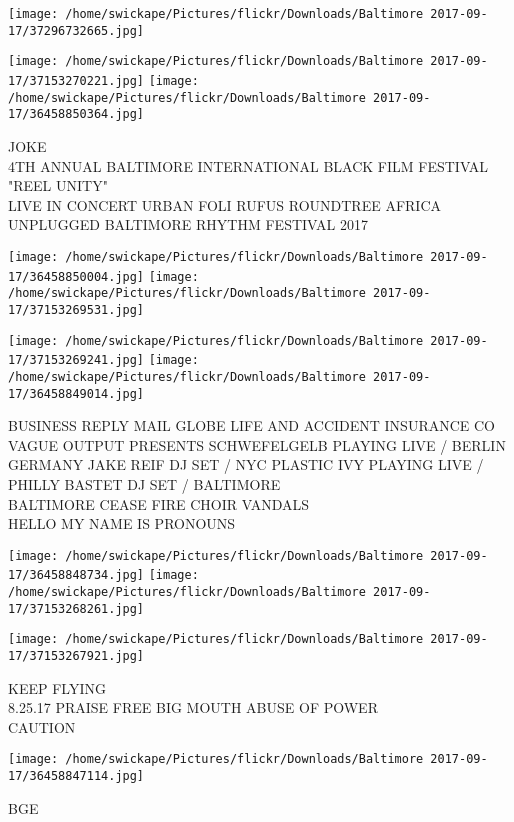 \documentclass[10pt,letterpaper]{article}
\begin{document}
\texttt{[image: /home/swickape/Pictures/flickr/Downloads/Baltimore 2017-09-17/37296732665.jpg]}

\vspace{0.25in}
\texttt{[image: /home/swickape/Pictures/flickr/Downloads/Baltimore 2017-09-17/37153270221.jpg]}
\texttt{[image: /home/swickape/Pictures/flickr/Downloads/Baltimore 2017-09-17/36458850364.jpg]}

JOKE\\
4TH ANNUAL BALTIMORE INTERNATIONAL BLACK FILM FESTIVAL "REEL UNITY"\\
LIVE IN CONCERT URBAN FOLI RUFUS ROUNDTREE AFRICA UNPLUGGED BALTIMORE RHYTHM FESTIVAL 2017\\
\pagebreak

\texttt{[image: /home/swickape/Pictures/flickr/Downloads/Baltimore 2017-09-17/36458850004.jpg]}
\texttt{[image: /home/swickape/Pictures/flickr/Downloads/Baltimore 2017-09-17/37153269531.jpg]}

\texttt{[image: /home/swickape/Pictures/flickr/Downloads/Baltimore 2017-09-17/37153269241.jpg]}
\texttt{[image: /home/swickape/Pictures/flickr/Downloads/Baltimore 2017-09-17/36458849014.jpg]}

BUSINESS REPLY MAIL GLOBE LIFE AND ACCIDENT INSURANCE CO\\
VAGUE OUTPUT PRESENTS SCHWEFELGELB  PLAYING LIVE / BERLIN GERMANY JAKE REIF DJ SET / NYC PLASTIC IVY PLAYING LIVE / PHILLY BASTET DJ SET / BALTIMORE\\
BALTIMORE CEASE FIRE CHOIR VANDALS\\
HELLO MY NAME IS PRONOUNS\\
\pagebreak

\texttt{[image: /home/swickape/Pictures/flickr/Downloads/Baltimore 2017-09-17/36458848734.jpg]}
\texttt{[image: /home/swickape/Pictures/flickr/Downloads/Baltimore 2017-09-17/37153268261.jpg]}

\texttt{[image: /home/swickape/Pictures/flickr/Downloads/Baltimore 2017-09-17/37153267921.jpg]}

KEEP FLYING\\
8.25.17 PRAISE FREE BIG MOUTH ABUSE OF POWER\\
CAUTION\\
\pagebreak

\texttt{[image: /home/swickape/Pictures/flickr/Downloads/Baltimore 2017-09-17/36458847114.jpg]}

BGE\\
\pagebreak
\end{document}
